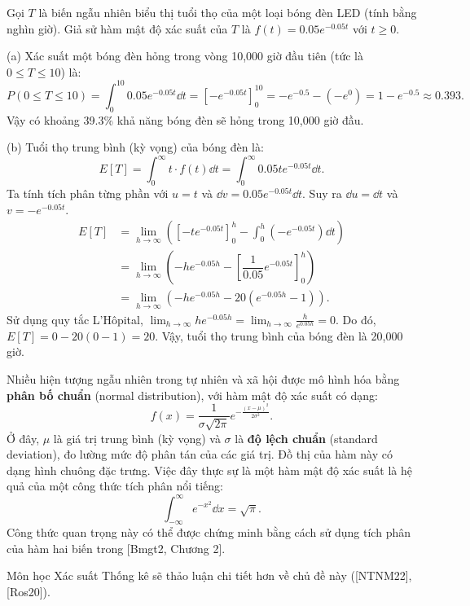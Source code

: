 \begin{example}
    Gọi $T$ là biến ngẫu nhiên biểu thị tuổi thọ của một loại bóng đèn LED (tính bằng nghìn giờ). Giả sử hàm mật độ xác suất của $T$ là $f(t) = 0.05e^{-0.05t}$ với $t \ge 0$.
\end{example}
\begin{solution}
    (a) Xác suất một bóng đèn hỏng trong vòng 10,000 giờ đầu tiên (tức là $0 \le T \le 10$) là:
    \[ P(0 \le T \le 10) = \int_0^{10} 0.05e^{-0.05t} \dd t = \left[-e^{-0.05t}\right]_0^{10} = -e^{-0.5} - (-e^0) = 1 - e^{-0.5} \approx 0.393. \]
    Vậy có khoảng 39.3\% khả năng bóng đèn sẽ hỏng trong 10,000 giờ đầu.

    (b) Tuổi thọ trung bình (kỳ vọng) của bóng đèn là:
    \[ E[T] = \int_0^\infty t \cdot f(t) \dd t = \int_0^\infty 0.05t e^{-0.05t} \dd t. \]
    Ta tính tích phân từng phần với $u = t$ và $\dd v = 0.05e^{-0.05t} \dd t$. Suy ra $\dd u = \dd t$ và $v = -e^{-0.05t}$.
    \begin{align*}
        E[T] &= \lim_{h \to \infty} \left( [-te^{-0.05t}]_0^h - \int_0^h (-e^{-0.05t}) \dd t \right) \\
        &= \lim_{h \to \infty} \left( -he^{-0.05h} - \left[ \dfrac{1}{0.05}e^{-0.05t} \right]_0^h \right) \\
        &= \lim_{h \to \infty} \left( -he^{-0.05h} - 20(e^{-0.05h} - 1) \right).
    \end{align*}
    Sử dụng quy tắc L'Hôpital, $\lim_{h \to \infty} he^{-0.05h} = \lim_{h \to \infty} \frac{h}{e^{0.05h}} = 0$.
    Do đó, $E[T] = 0 - 20(0 - 1) = 20$.
    Vậy, tuổi thọ trung bình của bóng đèn là 20,000 giờ.
\end{solution}

\begin{example}
    Nhiều hiện tượng ngẫu nhiên trong tự nhiên và xã hội được mô hình hóa bằng \textbf{phân bố chuẩn} (normal distribution), với hàm mật độ xác suất có dạng:
    \[ f(x) = \dfrac{1}{\sigma\sqrt{2\pi}} e^{-\frac{(x-\mu)^2}{2\sigma^2}}. \]
    Ở đây, $\mu$ là giá trị trung bình (kỳ vọng) và $\sigma$ là \textbf{độ lệch chuẩn} (standard deviation), đo lường mức độ phân tán của các giá trị. Đồ thị của hàm này có dạng hình chuông đặc trưng.
        Việc đây thực sự là một hàm mật độ xác suất là hệ quả của một công thức tích phân nổi tiếng:
    \[ \int_{-\infty}^\infty e^{-x^2} \dd x = \sqrt{\pi}. \]
    Công thức quan trọng này có thể được chứng minh bằng cách sử dụng tích phân của hàm hai biến trong [Bmgt2, Chương 2].
    
    Môn học Xác suất Thống kê sẽ thảo luận chi tiết hơn về chủ đề này ([NTNM22], [Ros20]).
\end{example}

